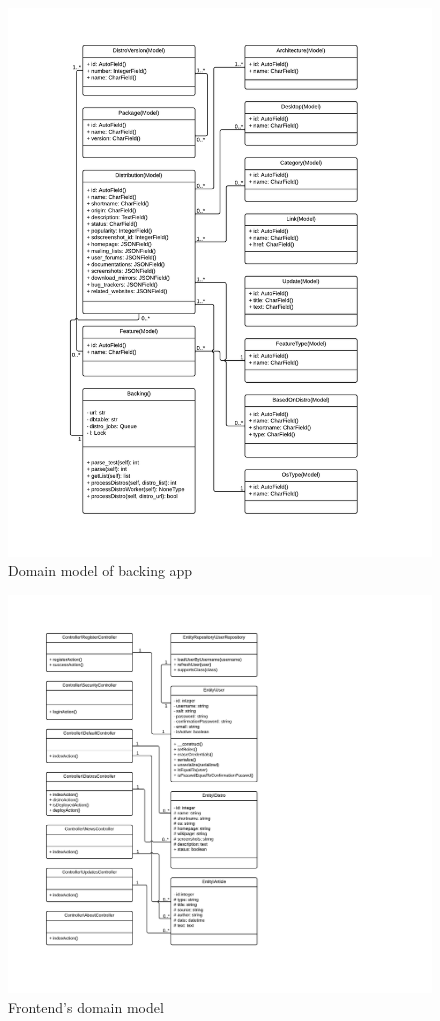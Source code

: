 \documentclass[thesis=B,english]{FITthesis}[2013/04/26]
\begin{document}
\begin{figure}[h!]
	\includegraphics[trim=2.5cm 2cm 3cm 1cm, clip=true, totalheight=600pt]{images/back_backing.pdf}
	\caption{Domain model of backing app}
\end{figure}

\begin{figure}[h!]
	\includegraphics[trim=2.5cm 2cm 3cm 2.5cm, clip=true, totalheight=600pt]{images/tndw-front.pdf}
	\caption{Frontend's domain model}
\end{figure}
\end{document}
